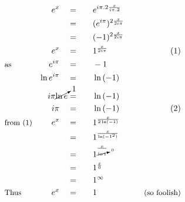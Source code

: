 \begin{alignat*}{5}
&\,&e^x\quad&=\quad&&e^{i\pi.2\frac{x}{i\pi.2}}\\
&\,&\,&=&&(e^{i\pi})^{2\frac{x}{2i\pi}}\\
&\,&\,&=&&(-1)^{2\frac{x}{2i\pi}}\\
&\,&e^x\quad&=&&1^\frac{x}{2i\pi}\qquad&\small(1)\\
&\small\text{as}&e^{i\pi}\quad&=&&-1\\
&\,&\ln{e^{i\pi}}\quad&=&&\ln{(-1)}\\
&\,&i\pi\cancelto{1}{\ln{e}}&=&&\ln{(-1)}\\
&\,&i\pi\quad&=&&\ln{(-1)}\qquad&\small(2)\\
&\small\text{from (1)}&e^x\quad&=&&1^\frac{x}{2\ln(-1)}\\
&\,&\,&=&&1^\frac{x}{\ln(-1^2)}\\
&\,&\,&=&&1^\frac{x}{\cancelto{0}{\ln{1}}}\\
&\,&\,&=&&1^\frac{x}{0}\\
&\,&\,&=&&1^\infty\\
&\small\text{Thus}&e^x\quad&=&&1\quad&\small\text{(so foolish)}
\end{alignat*}
